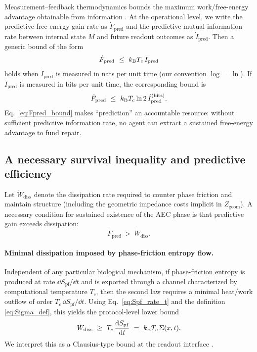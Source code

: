 Measurement--feedback thermodynamics bounds the maximum work/free-energy advantage obtainable from information \cite{SagawaUeda2010,ParrondoHorowitzSagawa2015}.
At the operational level, we write the predictive free-energy gain rate as $\dot F_{\mathrm{pred}}$ and the predictive mutual information rate between internal state $M$ and future readout outcomes as $\dot I_{\mathrm{pred}}$.
Then a generic bound of the form
\begin{equation}
  \dot F_{\mathrm{pred}}\ \le\ k_{\mathrm{B}} T_c\, \dot I_{\mathrm{pred}}
  \label{eq:Fpred_bound}
\end{equation}
holds when $\dot I_{\mathrm{pred}}$ is measured in nats per unit time (our convention $\log=\ln$). If $\dot I_{\mathrm{pred}}$ is measured in bits per unit time, the corresponding bound is
\begin{equation}
  \dot F_{\mathrm{pred}}\ \le\ k_{\mathrm{B}} T_c\ln 2\, \dot I_{\mathrm{pred}}^{(\mathrm{bits})}.
\end{equation}
Eq.~\eqref{eq:Fpred_bound} makes ``prediction'' an accountable resource: without sufficient predictive information rate, no agent can extract a sustained free-energy advantage to fund repair.

\subsection{A necessary survival inequality and predictive efficiency}
\label{sec:survival_inequality}

Let $\dot W_{\mathrm{diss}}$ denote the dissipation rate required to counter phase friction and maintain structure (including the geometric impedance costs implicit in $Z_{\mathrm{geom}}$).
A necessary condition for sustained existence of the AEC phase is that predictive gain exceeds dissipation:
\begin{equation}
  \dot F_{\mathrm{pred}}\ >\ \dot W_{\mathrm{diss}}.
  \label{eq:survival_basic}
\end{equation}
\paragraph{Minimal dissipation imposed by phase-friction entropy flow.}
Independent of any particular biological mechanism, if phase-friction entropy is produced at rate $\dd S_{\mathrm{pf}}/\dd t$ and is exported through a channel characterized by computational temperature $T_c$, then the second law requires a minimal heat/work outflow of order $T_c\,\dd S_{\mathrm{pf}}/\dd t$.
Using Eq.~\eqref{eq:Spf_rate_t} and the definition \eqref{eq:Sigma_def}, this yields the protocol-level lower bound
\begin{equation}
  \dot W_{\mathrm{diss}} \ \ge\ T_c\,\frac{\mathrm{d} S_{\mathrm{pf}}}{\mathrm{d} t}
  \ =\ k_{\mathrm{B}} T_c\,\Sigma(x,t).
  \label{eq:Wdiss_lower}
\end{equation}
We interpret this as a Clausius-type bound at the readout interface \cite{Callen1985,Seifert2012}.

